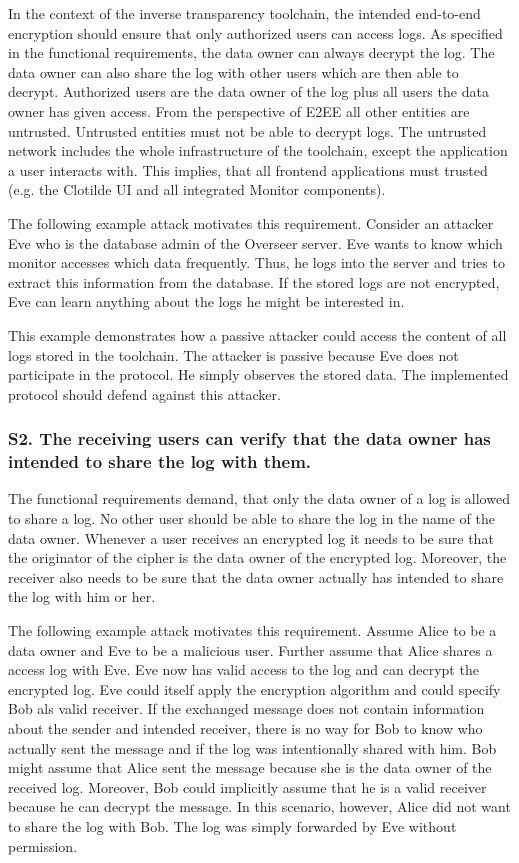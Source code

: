 \documentclass[../main.tex]{subfiles}
\begin{document}
In the context of the inverse transparency toolchain, the intended end-to-end encryption should ensure that only authorized users can access logs.
As specified in the functional requirements, the data owner can always decrypt the log.
The data owner can also share the log with other users which are then able to decrypt.
Authorized users are the data owner of the log plus all users the data owner has given access.
From the perspective of E2EE all other entities are untrusted.
Untrusted entities must not be able to decrypt logs.
The untrusted network includes the whole infrastructure of the toolchain, except the application a user interacts with.
This implies, that all frontend applications must trusted (e.g. the Clotilde UI and all integrated Monitor components).

The following example attack motivates this requirement.
Consider an attacker Eve who is the database admin of the Overseer server.
Eve wants to know which monitor accesses which data frequently.
Thus, he logs into the server and tries to extract this information from the database.
If the stored logs are not encrypted, Eve can learn anything about the logs he might be interested in.

This example demonstrates how a passive attacker could access the content of all logs stored in the toolchain.
The attacker is passive because Eve does not participate in the protocol.
He simply observes the stored data.
The implemented protocol should defend against this attacker.


\subsubsection{S2. The receiving users can verify that the data owner has intended to share the log with them.}

The functional requirements demand, that only the data owner of a log is allowed to share a log.
No other user should be able to share the log in the name of the data owner.
Whenever a user receives an encrypted log it needs to be sure that the originator of the cipher is the data owner of the encrypted log.
Moreover, the receiver also needs to be sure that the data owner actually has intended to share the log with him or her.

The following example attack motivates this requirement.
Assume Alice to be a data owner and Eve to be a malicious user.
Further assume that Alice shares a access log with Eve.
Eve now has valid access to the log and can decrypt the encrypted log.
Eve could itself apply the encryption algorithm and could specify Bob als valid receiver.
If the exchanged message does not contain information about the sender and intended receiver, there is no way for Bob to know who actually sent the message and if the log was intentionally shared with him.
Bob might assume that Alice sent the message because she is the data owner of the received log.
Moreover, Bob could implicitly assume that he is a valid receiver because he can decrypt the message.
In this scenario, however, Alice did not want to share the log with Bob.
The log was simply forwarded by Eve without permission.
\end{document}
